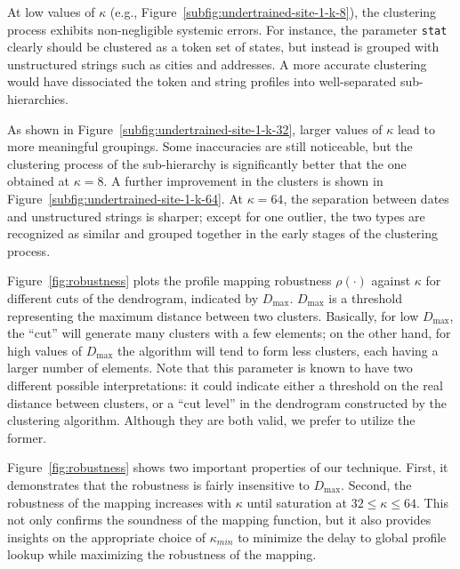 At low values of $\kappa$ (e.g.,
Figure~\ref{subfig:undertrained-site-1-k-8}), the clustering process
exhibits non-negligible systemic errors. For instance, the parameter
\texttt{stat} clearly should be clustered as a token set of states,
but instead is grouped with unstructured strings such as cities and
addresses.  A more accurate clustering would have dissociated the
token and string profiles into well-separated sub-hierarchies.

As shown in Figure~\ref{subfig:undertrained-site-1-k-32}, larger
values of $\kappa$ lead to more meaningful groupings. Some
inaccuracies are still noticeable, but the clustering process of the
sub-hierarchy is significantly better that the one obtained at $\kappa
= 8$. A further improvement in the clusters is shown in
Figure~\ref{subfig:undertrained-site-1-k-64}. At $\kappa = 64$, the
separation between dates and unstructured strings is sharper; except
for one outlier, the two types are recognized as similar and grouped
together in the early stages of the clustering process.

Figure~\ref{fig:robustness} plots the profile mapping robustness
$\rho(\cdot)$ against $\kappa$ for different cuts of the dendrogram,
indicated by $D_{\text{max}}$.  $D_{\text{max}}$ is a threshold
representing the maximum distance between two clusters. Basically, for
low $D_{\text{max}}$, the ``cut'' will generate many clusters with a
few elements; on the other hand, for high values of $D_{\text{max}}$
the algorithm will tend to form less clusters, each having a larger
number of elements. Note that this parameter is known to have two
different possible interpretations: it could indicate either a
threshold on the real distance between clusters, or a ``cut level'' in
the dendrogram constructed by the clustering algorithm. Although they
are both valid, we prefer to utilize the former.

Figure~\ref{fig:robustness} shows two important properties of our
technique. First, it demonstrates that the robustness is fairly
insensitive to $D_{\text{max}}$.  Second, the robustness of the
mapping increases with $\kappa$ until saturation at
$32\leq\kappa\leq64$.  This not only confirms the soundness of the
mapping function, but it also provides insights on the appropriate
choice of $\kappa_{min}$ to minimize the delay to global profile
lookup while maximizing the robustness of the mapping.


